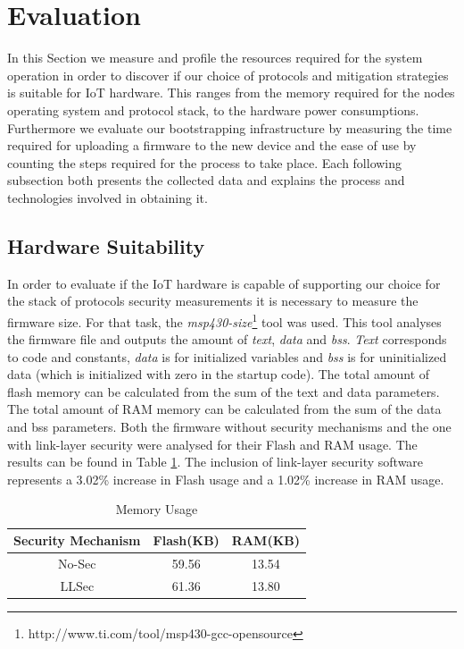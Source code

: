 \documentclass{llncs}
\begin{document}
\section{Evaluation}
\label{sec:evaluation}
In this Section we measure and profile the resources required for the system operation in order to discover if our choice of protocols and mitigation strategies is suitable for \ac{IoT} hardware. 
This ranges from the memory required for the nodes operating system and protocol stack, to the hardware power consumptions. 
Furthermore we evaluate our bootstrapping infrastructure by measuring the time required for uploading a firmware to the new device and the ease of use by counting the steps required for the process to take place. 
Each following subsection both presents the collected data and explains the process and technologies involved in obtaining it.

\subsection{Hardware Suitability}
In order to evaluate if the \ac{IoT} hardware is capable of supporting our choice for the stack of protocols security measurements it is necessary to measure the firmware size. 
For that task, the \textit{msp430-size}\footnote{http://www.ti.com/tool/msp430-gcc-opensource} tool was used. 
This tool analyses the firmware file and outputs the amount of \textit{text}, \textit{data} and \textit{bss}.
\textit{Text} corresponds to code and constants, \textit{data} is for initialized variables and \textit{bss} is for uninitialized data (which is initialized with zero in the startup code).
The total amount of flash memory can be calculated from the sum of the text and data parameters.
The total amount of \ac{RAM} memory can be calculated from the sum of the data and bss parameters.
Both the firmware without security mechanisms and the one with link-layer security were analysed for their Flash and RAM usage. 
The results can be found in Table \ref{tab:space_req}. The inclusion of link-layer security software represents a 3.02\% increase in Flash usage and a 1.02\% increase in RAM usage.

\begin{table}
\centering
\caption{Memory Usage}
\label{tab:space_req}
\begin{tabular}{|c|c|c|} \hline
Security Mechanism&Flash(KB)&RAM(KB)\\ \hline
No-Sec& 59.56& 13.54\\ \hline
LLSec& 61.36& 13.80\\ %
\hline\end{tabular}
\end{table}
\end{document}
